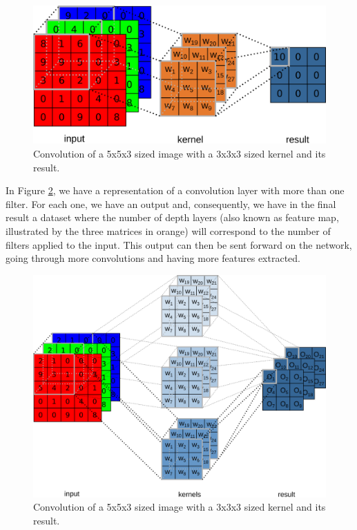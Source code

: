 \begin{figure}
    \centering
    \includegraphics[scale=0.35]{images/figure118.png}
    \caption{Convolution of a 5x5x3 sized image with a 3x3x3 sized kernel and its result.}
    \label{fig:figure118}
\end{figure}

In Figure \ref{fig:figure119}, we have a representation of a convolution layer with more than one filter. For each one, we have an output and, consequently, we have in the final result a dataset where the number of depth layers (also known as feature map, illustrated by the three matrices in orange) will correspond to the number of filters applied to the input. This output can then be sent forward on the network, going through more convolutions and having more features extracted.

\begin{figure}
    \centering
    \includegraphics[scale=0.25]{images/figure119.png}
    \caption{Convolution of a 5x5x3 sized image with a 3x3x3 sized kernel and its result.}
    \label{fig:figure119}
\end{figure}

